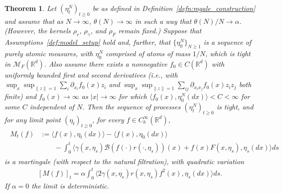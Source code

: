 \documentclass[12pt]{article}
\newtheorem{theorem}{Theorem}[section]
\newcommand{\IR}{\mathbb R}
\newcommand{\measures}{\mathcal{M}_F(\IR^d)} %
\numberwithin{equation}{section}
\begin{document}
\begin{theorem} \label{thm:nonlocal_convergence}
    Let $(\eta^N_t)_{t \geq 0}$
    be as defined in Definition~\ref{defn:mgale_construction}
	and assume that as $N \to \infty$, $\theta(N) \to \infty$
	in such a way that $\theta(N)/N \to \alpha$.
    (However, the kernels $\rho_r$, $\rho_\gamma$, and $\rho_F$
    remain fixed.) 
    Suppose that Assumptions~\ref{def:model_setup} hold and, 
    further, that $\{\eta_0^N\}_{N\geq 1}$ is a sequence of 
    purely atomic measures, with $\eta_0^N$ comprised of atoms of mass $1/N$,
    which is tight in $\measures$.
    Also assume there exists a nonnegative $f_0 \in C(\IR^d)$
    with uniformly bounded first and second derivatives
    (i.e., with $\sup_x \sup_{\|z\|=1} \sum_i \partial_{x_i} f_0(x) z_i$
    and $\sup_x \sup_{\|z\|=1} \sum_{ij} \partial_{x_i x_j} f_0(x) z_i z_j$ both finite)
    and $f_0(x) \to \infty$ as $|x| \to \infty$ for which
    $\langle f_0(x), \eta_0^N(dx)\rangle<C<\infty$
    for some $C$ independent of $N$.
    Then the sequence of processes
    $(\eta^N_t)_{t \geq 0}$ is tight, and for any limit point
    $(\eta_t)_{t \geq 0}$, for every $f \in C^\infty_b(\IR^d)$,
    \begin{align} \label{eqn:limiting_mgale_problem}
        \begin{split}
        M_t(f)
            &:=
            \langle f(x), \eta_t(dx) \rangle
            -
            \langle f(x), \eta_0(dx) \rangle
            \\ & \qquad
            -
            \int_0^t \big\langle
                \gamma(x, \eta_s)
                \mathcal{B}\left(
                    f(\cdot) r(\cdot, \eta_s)
                \right)(x)
                +
                f(x)
                F(x, \eta_s),
                \eta_{s}(dx)
            \big\rangle ds
        \end{split}
    \end{align}
    is a martingale (with respect to the natural filtration),
    with quadratic variation
    \begin{align} \label{eqn:limiting_mgale_variation}
        [ M(f) ]_t
        =
        \alpha
        \int_0^t
        \big\langle
	    2\gamma\left( x, \eta_{s} \right)
            r\left(x, \eta_{s} \right)%
            f^2(x),
            \eta_{s} (dx)
        \big\rangle ds. 
    \end{align}
    If $\alpha = 0$ the limit is deterministic.
\end{theorem}
\end{document}
